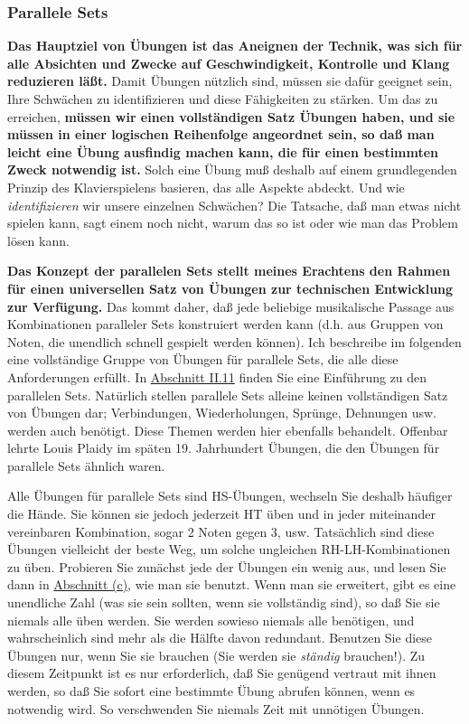 
\subsubsection{Parallele Sets}
\label{c1iii7b}

\textbf{Das Hauptziel von Übungen ist das Aneignen der Technik, was sich für alle Absichten und Zwecke auf Geschwindigkeit, Kontrolle und Klang reduzieren läßt.}
Damit Übungen nützlich sind, müssen sie dafür geeignet sein, Ihre Schwächen zu identifizieren und diese Fähigkeiten zu stärken.
Um das zu erreichen, \textbf{müssen wir einen vollständigen Satz Übungen haben, und sie müssen in einer logischen Reihenfolge angeordnet sein, so daß man leicht eine Übung ausfindig machen kann, die für einen bestimmten Zweck notwendig ist.}
Solch eine Übung muß deshalb auf einem grundlegenden Prinzip des Klavierspielens basieren, das alle Aspekte abdeckt.
Und wie \textit{identifizieren} wir unsere einzelnen Schwächen?
Die Tatsache, daß man etwas nicht spielen kann, sagt einem noch nicht, warum das so ist oder wie man das Problem lösen kann.

\textbf{Das Konzept der parallelen Sets stellt meines Erachtens den Rahmen für einen universellen Satz von Übungen zur technischen Entwicklung zur Verfügung.}
Das kommt daher, daß jede beliebige musikalische Passage aus Kombinationen paralleler Sets konstruiert werden kann (d.h. aus Gruppen von Noten, die unendlich schnell gespielt werden können).
Ich beschreibe im folgenden eine vollständige Gruppe von Übungen für parallele Sets, die alle diese Anforderungen erfüllt.
In \hyperref[c1ii11]{Abschnitt II.11} finden Sie eine Einführung zu den parallelen Sets.
Natürlich stellen parallele Sets alleine keinen vollständigen Satz von Übungen dar; Verbindungen, Wiederholungen, Sprünge, Dehnungen usw. werden auch benötigt.
Diese Themen werden hier ebenfalls behandelt.
Offenbar lehrte Louis Plaidy im späten 19. Jahrhundert Übungen, die den Übungen für parallele Sets ähnlich waren.

Alle Übungen für parallele Sets sind HS-Übungen, wechseln Sie deshalb häufiger die Hände.
Sie können sie jedoch jederzeit HT üben und in jeder miteinander vereinbaren Kombination, sogar 2 Noten gegen 3, usw.
Tatsächlich sind diese Übungen vielleicht der beste Weg, um solche ungleichen RH-LH-Kombinationen zu üben.
Probieren Sie zunächst jede der Übungen ein wenig aus, und lesen Sie dann in \hyperref[c1iii7c]{Abschnitt (c)}, wie man sie benutzt.
Wenn man sie erweitert, gibt es eine unendliche Zahl (was sie sein sollten, wenn sie vollständig sind), so daß Sie sie niemals alle üben werden.
Sie werden sowieso niemals alle benötigen, und wahrscheinlich sind mehr als die Hälfte davon redundant.
Benutzen Sie diese Übungen nur, wenn Sie sie brauchen (Sie werden sie \textit{ständig} brauchen!).
Zu diesem Zeitpunkt ist es nur erforderlich, daß Sie genügend vertraut mit ihnen werden, so daß Sie sofort eine bestimmte Übung abrufen können, wenn es notwendig wird.
So verschwenden Sie niemals Zeit mit unnötigen Übungen.

